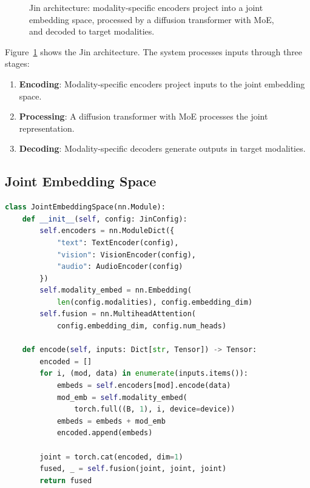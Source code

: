 \begin{figure}[t]
\caption{Jin architecture: modality-specific encoders project into a joint embedding space, processed by a diffusion transformer with MoE, and decoded to target modalities.}
\label{fig:architecture}
\end{figure}

Figure~\ref{fig:architecture} shows the Jin architecture. The system processes inputs through three stages:

\begin{enumerate}
    \item \textbf{Encoding}: Modality-specific encoders project inputs to the joint embedding space.
    \item \textbf{Processing}: A diffusion transformer with MoE processes the joint representation.
    \item \textbf{Decoding}: Modality-specific decoders generate outputs in target modalities.
\end{enumerate}

\subsection{Joint Embedding Space}

\begin{lstlisting}[language=Python]
class JointEmbeddingSpace(nn.Module):
    def __init__(self, config: JinConfig):
        self.encoders = nn.ModuleDict({
            "text": TextEncoder(config),
            "vision": VisionEncoder(config),
            "audio": AudioEncoder(config)
        })
        self.modality_embed = nn.Embedding(
            len(config.modalities), config.embedding_dim)
        self.fusion = nn.MultiheadAttention(
            config.embedding_dim, config.num_heads)

    def encode(self, inputs: Dict[str, Tensor]) -> Tensor:
        encoded = []
        for i, (mod, data) in enumerate(inputs.items()):
            embeds = self.encoders[mod].encode(data)
            mod_emb = self.modality_embed(
                torch.full((B, 1), i, device=device))
            embeds = embeds + mod_emb
            encoded.append(embeds)

        joint = torch.cat(encoded, dim=1)
        fused, _ = self.fusion(joint, joint, joint)
        return fused
\end{lstlisting}

